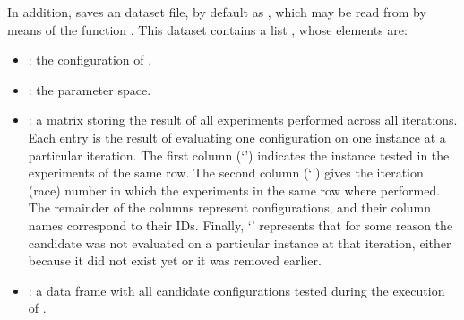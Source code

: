 \documentclass[article,a4paper,nojss,notitle]{jss}
\newcommand{\irace}{\pkg{irace}\xspace}
\newcommand{\aR}{\proglang{R}\xspace}
\newcommand{\SoftwarePackage}{\pkg}
\newcommand{\SPEAR}{\SoftwarePackage{SPEAR}\xspace}
\begin{document}
In addition, \irace saves an \aR dataset file, by
default as , which may be read from \aR
by means of the function . This dataset contains a list , whose elements are: 

\begin{itemize}
\item {}: the configuration of \irace.
\item {}: the parameter space.
\item {}: a matrix storing the result of all
  experiments performed across all iterations. Each entry is the
  result of evaluating one configuration on one instance at a
  particular iteration. The first column (`') indicates
  the instance tested in the experiments of the same row.  The second
  column (`') gives the iteration (race) number in
  which the experiments in the same row where performed. The remainder
  of the columns represent configurations, and their column names
  correspond to their IDs. Finally, `' represents that for some
  reason the candidate was not evaluated on a particular instance at
  that iteration, either because it did not exist yet or it was removed
  earlier.
\item {}: a data frame with all candidate
  configurations tested during the execution of \irace.
\end{itemize}



\end{document}
